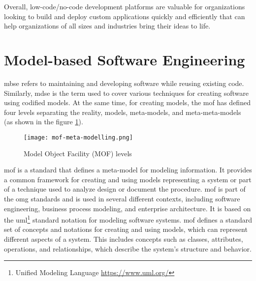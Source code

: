 Overall, low-code/no-code development platforms are valuable for organizations looking to build and deploy custom applications quickly and efficiently that can help organizations of all sizes and industries bring their ideas to life.
\clearpage
\section{Model-based Software Engineering}
\label{background:section:mbse}
\ac{mbse} refers to maintaining and developing software while reusing existing code.
Similarly, \ac{mdse} is the term used to cover various techniques for creating software using codified models.
At the same time, for creating models, the \ac{mof} has defined four levels separating the reality, models, meta-models, and meta-meta-models (as shown in the figure \ref{fig:background:moflevels}).
\begin{figure}[htbp!]
  \centering    
  \texttt{[image: mof-meta-modelling.png]}
  \caption[MOF levels]{Model Object Facility (MOF) levels}
  \label{fig:background:moflevels}
\end{figure}

\ac{mof} is a standard that defines a meta-model for modeling information. 
It provides a common framework for creating and using models representing a system or part of a technique used to analyze design or document the procedure.
\ac{mof} is part of the \ac{omg} \cite{misc:mbse:mof} standards and is used in several different contexts, including software engineering, business process modeling, and enterprise architecture. 
It is based on the \ac{uml}\footnote{Unified Modeling Language \url{https://www.uml.org/}} standard notation for modeling software systems.
\ac{mof} defines a standard set of concepts and notations for creating and using models, which can represent different aspects of a system. 
This includes concepts such as classes, attributes, operations, and relationships, which describe the system's structure and behavior.

